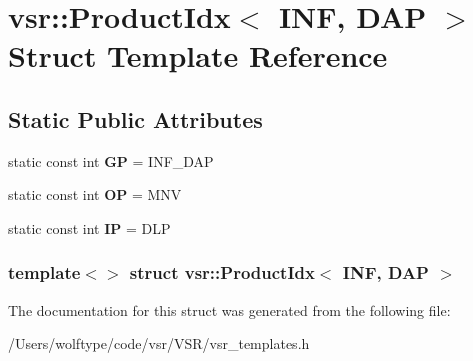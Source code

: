 \hypertarget{structvsr_1_1_product_idx_3_01_i_n_f_00_01_d_a_p_01_4}{\section{vsr\-:\-:Product\-Idx$<$ I\-N\-F, D\-A\-P $>$ Struct Template Reference}
\label{structvsr_1_1_product_idx_3_01_i_n_f_00_01_d_a_p_01_4}
}
\subsection*{Static Public Attributes}
\begin{DoxyCompactItemize}
\item 
\hypertarget{structvsr_1_1_product_idx_3_01_i_n_f_00_01_d_a_p_01_4_a2a6a85d5ab3f32709a182997fcffe563}{static const int {\bfseries G\-P} = I\-N\-F\-\_\-\-D\-A\-P}\label{structvsr_1_1_product_idx_3_01_i_n_f_00_01_d_a_p_01_4_a2a6a85d5ab3f32709a182997fcffe563}

\item 
\hypertarget{structvsr_1_1_product_idx_3_01_i_n_f_00_01_d_a_p_01_4_a733e1fc2b6fbf12b333b4b29a40549f9}{static const int {\bfseries O\-P} = M\-N\-V}\label{structvsr_1_1_product_idx_3_01_i_n_f_00_01_d_a_p_01_4_a733e1fc2b6fbf12b333b4b29a40549f9}

\item 
\hypertarget{structvsr_1_1_product_idx_3_01_i_n_f_00_01_d_a_p_01_4_a7d7937c3f05fe7c7afd3010f098b0155}{static const int {\bfseries I\-P} = D\-L\-P}\label{structvsr_1_1_product_idx_3_01_i_n_f_00_01_d_a_p_01_4_a7d7937c3f05fe7c7afd3010f098b0155}

\end{DoxyCompactItemize}
\subsubsection*{template$<$$>$ struct vsr\-::\-Product\-Idx$<$ I\-N\-F, D\-A\-P $>$}



The documentation for this struct was generated from the following file\-:\begin{DoxyCompactItemize}
\item 
/\-Users/wolftype/code/vsr/\-V\-S\-R/vsr\-\_\-templates.\-h\end{DoxyCompactItemize}

